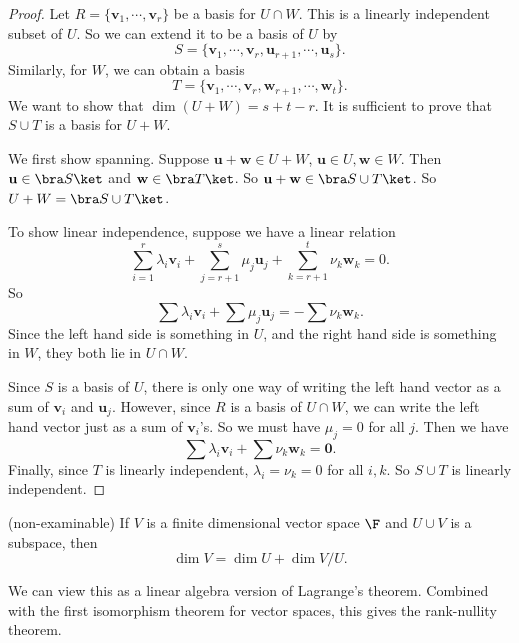 \documentclass[a4paper]{article}
\begin{document}
\begin{proof}
  Let $R = \{\mathbf{v}_1, \cdots, \mathbf{v}_r\}$ be a basis for $U\cap W$. This is a linearly independent subset of $U$. So we can extend it to be a basis of $U$ by
  \[
    S = \{\mathbf{v}_1, \cdots, \mathbf{v}_r, \mathbf{u}_{r + 1}, \cdots, \mathbf{u}_s\}.
  \]
  Similarly, for $W$, we can obtain a basis
  \[
    T = \{\mathbf{v}_1, \cdots, \mathbf{v}_r, \mathbf{w}_{r + 1}, \cdots, \mathbf{w}_t\}.
  \]
  We want to show that $\dim (U + W) = s + t - r$. It is sufficient to prove that $S\cup T$ is a basis for $U + W$.

  We first show spanning. Suppose $\mathbf{u} + \mathbf{w} \in U + W$, $\mathbf{u}\in U, \mathbf{w}\in W$. Then $\mathbf{u}\in \bra S\ket$ and $\mathbf{w}\in \bra T\ket$. So $\mathbf{u} + \mathbf{w} \in \bra S\cup T\ket$. So $U + W = \bra S \cup T\ket$.

  To show linear independence, suppose we have a linear relation
  \[
    \sum_{i = 1}^r \lambda_i \mathbf{v}_i + \sum_{j = r + 1}^s \mu_j \mathbf{u}_j + \sum_{k = r + 1}^t \nu_k \mathbf{w}_k = 0.
  \]
  So
  \[
    \sum \lambda_i \mathbf{v}_i + \sum \mu_j \mathbf{u}_j = - \sum \nu_k \mathbf{w}_k.
  \]
  Since the left hand side is something in $U$, and the right hand side is something in $W$, they both lie in $U\cap W$.

  Since $S$ is a basis of $U$, there is only one way of writing the left hand vector as a sum of $\mathbf{v}_i$ and $\mathbf{u}_j$. However, since $R$ is a basis of $U\cap W$, we can write the left hand vector just as a sum of $\mathbf{v}_i$'s. So we must have $\mu_j = 0$ for all $j$. Then we have
  \[
    \sum \lambda_i \mathbf{v}_i + \sum \nu_k \mathbf{w}_k = \mathbf{0}.
  \]
  Finally, since $T$ is linearly independent, $\lambda_i = \nu_k = 0$ for all $i, k$. So $S\cup T$ is linearly independent.
\end{proof}

\begin{prop}(non-examinable)
  If $V$ is a finite dimensional vector space $\F$ and $U\cup V$ is a subspace, then
  \[
    \dim V = \dim U + \dim V/U.
  \]
\end{prop}
We can view this as a linear algebra version of Lagrange's theorem. Combined with the first isomorphism theorem for vector spaces, this gives the rank-nullity theorem.
\end{document}
